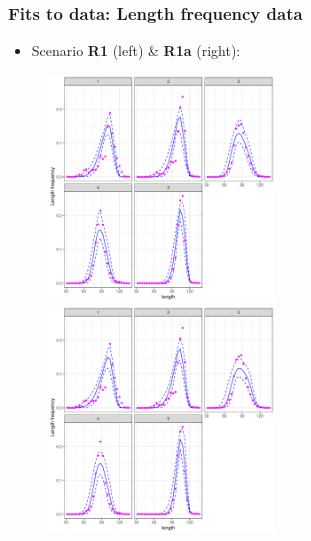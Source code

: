 \documentclass{beamer}
\begin{document}
\begin{frame}
    \frametitle{Fits to data: Length frequency data}
\begin{itemize}
    \item Scenario \textbf{R1} (left) \& \textbf{R1a} (right):
\end{itemize}
\vspace{0.25cm}
\begin{figure}
\begin{center}
        \includegraphics[width=6cm,height=6cm]{figs/case4_lffits.pdf}\includegraphics[width=6cm,height=6cm]{figs/case4a_lffits.pdf}
    \end{center}
\end{figure}
\end{frame}
\end{document}
